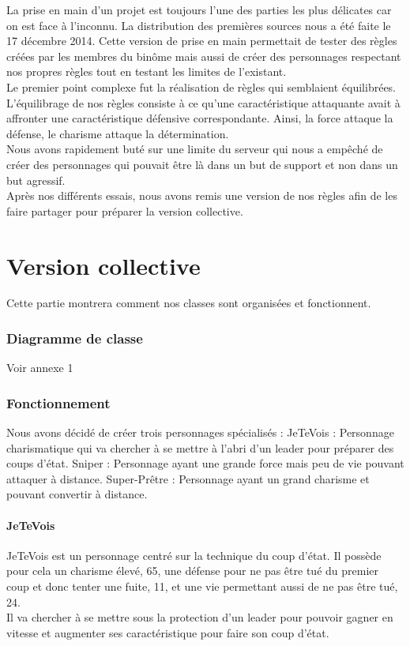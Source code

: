\documentclass{article}
\begin{document}
La prise en main d'un projet est toujours l'une des parties les plus délicates car on est face à l'inconnu. La distribution des premières sources nous a été faite le 17 décembre 2014. Cette version de prise en main permettait de tester des règles créées par les membres du binôme mais aussi de créer des personnages respectant nos propres règles tout en testant les limites de l'existant.\\
Le premier point complexe fut la réalisation de règles qui semblaient équilibrées. L'équilibrage de nos règles consiste à ce qu'une caractéristique attaquante avait à affronter une caractéristique défensive correspondante. Ainsi, la force attaque la défense, le charisme attaque la détermination.\\
Nous avons rapidement buté sur une limite du serveur qui nous a empêché de créer des personnages qui pouvait être là dans un but de support et non dans un but agressif.\\
Après nos différents essais, nous avons remis une version de nos règles afin de les faire partager pour préparer la version collective.


\part{Version collective}
Cette partie montrera comment nos classes sont organisées et fonctionnent.

\section{Diagramme de classe}
Voir annexe 1

\section{Fonctionnement}
Nous avons décidé de créer trois personnages spécialisés  :
JeTeVois : Personnage charismatique qui va chercher à se mettre à l'abri d'un leader pour préparer des coups d'état.
Sniper : Personnage ayant une grande force mais peu de vie pouvant attaquer à distance.
Super-Prêtre : Personnage ayant un grand charisme et pouvant convertir à distance.

\subsection{JeTeVois}
JeTeVois est un personnage centré sur la technique du coup d'état. Il possède pour cela un charisme élevé, 65, une défense pour ne pas être tué du premier coup et donc tenter une fuite, 11, et une vie permettant aussi de ne pas être tué, 24.\\
Il va chercher à se mettre sous la protection d'un leader pour pouvoir gagner en vitesse et augmenter ses caractéristique pour faire son coup d'état.
\end{document}

